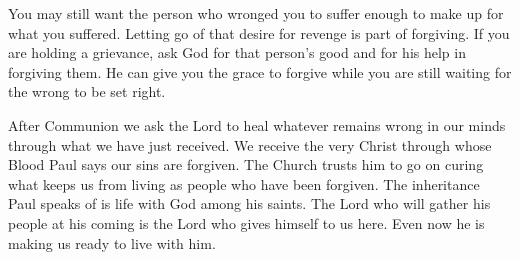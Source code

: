You may still want the person who wronged you to suffer enough to make up
for what you suffered. Letting go of that desire for revenge is part of
forgiving. If you are holding a grievance, ask God for that person's good
and for his help in forgiving them. He can give you the grace to forgive
while you are still waiting for the wrong to be set right.

After Communion we ask the Lord to heal whatever remains wrong in our minds
through what we have just received. We receive the very Christ through whose
Blood Paul says our sins are forgiven. The Church trusts him to go on curing
what keeps us from living as people who have been forgiven. The inheritance
Paul speaks of is life with God among his saints. The Lord who will gather
his people at his coming is the Lord who gives himself to us here. Even now
he is making us ready to live with him.
